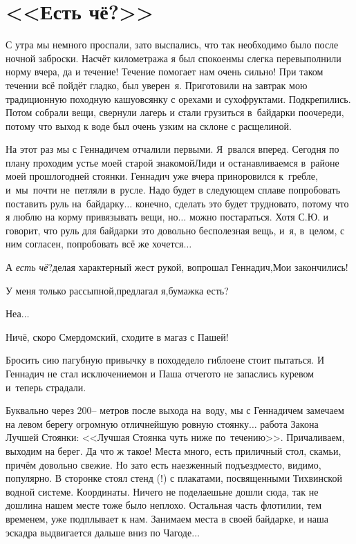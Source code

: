 \chapter{<<Есть чё?>>} 
\vepsianrose

С утра мы немного проспали, зато выспались, что так необходимо было после ночной заброски. Насчёт километража я был спокоен\mdash мы слегка перевыполнили норму вчера, да и течение! Течение помогает нам очень сильно! При таком течении всё пойдёт гладко, был уверен~я. Приготовили на завтрак мою традиционную походную кашу\mdash овсянку с орехами и сухофруктами. Подкрепились. Потом собрали вещи, свернули лагерь и стали грузиться в~байдарки по\sdash очереди, потому что выход к воде был очень узким на склоне с расщелиной. 

На этот раз мы с Геннадичем отчалили первыми. Я~рвался вперед. Сегодня по плану проходим устье моей старой знакомой\mdash  Лиди и останавливаемся в~районе моей прошлогодней стоянки. Геннадич уже вчера приноровился к~гребле, и~мы~почти не~петляли в~русле. Надо будет в следующем сплаве попробовать поставить руль на~байдарку$\ldots$ конечно, сделать это будет трудновато, потому что я люблю на корму привязывать вещи, но$\ldots$ можно постараться. Хотя С.Ю. и говорит, что руль для байдарки это довольно бесполезная вещь, и~я, в~целом, с ним согласен, попробовать всё же хочется$\ldots$ 

\diagdash А \textit{есть чё}?\mdash делая характерный жест рукой, вопрошал Геннадич,\mdash Мои закончились!

\diagdash У меня только рассыпной,\mdash предлагал я,\mdash бумажка есть?

\diagdash Неа$\ldots$

\diagdash Ничё, скоро Смердомский, сходите в магаз с Пашей!

Бросить сию пагубную привычку в походе\mdash дело гиблое\mdash не стоит пытаться. И Геннадич не стал исключением\mdash он и Паша отчего\sdash то не запаслись куревом и~теперь страдали.

Буквально через 200\thinspace\nobreakdash-- метров после выхода на~воду, мы с Геннадичем замечаем на левом берегу огромную отличнейшую ровную стоянку$\ldots$  работа Закона Лучшей Стоянки: <<Лучшая Стоянка чуть ниже по~течению>>. Причаливаем, выходим на берег. Да что ж такое! Места много, есть приличный стол, скамьи, причём довольно свежие. Но зато есть наезженный подъезд\mdash  место, видимо, популярно. В сторонке стоял стенд (!) с плакатами, посвященными Тихвинской водной системе. Координаты\mdash \CoordsChagodaGood. Ничего не поделаешь\mdash не дошли сюда, так не дошли\mdash на нашем месте тоже было неплохо. Остальная часть флотилии, тем временем, уже подплывает к нам. Занимаем места в своей байдарке, и наша эскадра выдвигается дальше вниз по Чагоде$\ldots$  

